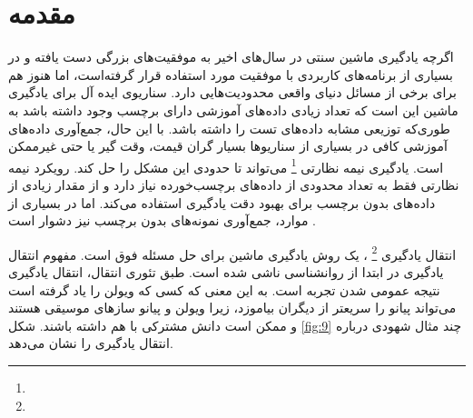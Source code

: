 \section{مقدمه}
{
	اگرچه یادگیری ماشین سنتی در سال‌های اخیر به موفقیت‌های بزرگی دست یافته و در بسیاری از برنامه‌های کاربردی با موفقیت مورد استفاده قرار گرفته‌است، اما هنوز هم برای برخی از مسائل دنیای واقعی محدودیت‌هایی دارد. سناریوی ایده آل برای یادگیری ماشین این است که تعداد زیادی داده‌های آموزشی دارای برچسب وجود داشته باشد به طوری‌که توزیعی مشابه داده‌های تست  را داشته باشد. با این حال، جمع‌آوری داده‌های آموزشی کافی در بسیاری از سناریوها بسیار گران قیمت، وقت گیر یا حتی غیرممکن است. یادگیری نیمه نظارتی
	\footnote{}
	 می‌تواند تا حدودی این مشکل را حل کند. رویکرد نیمه نظارتی فقط به تعداد محدودی از داده‌های برچسب‌‌‌خورده نیاز دارد و از مقدار زیادی از داده‌های بدون برچسب برای بهبود دقت یادگیری استفاده می‌کند. اما در بسیاری از موارد، جمع‌آوری نمونه‌های بدون برچسب نیز دشوار است
	\cite{zhuang2020comprehensive}.
	
	
	انتقال یادگیری
	\footnote{}
	، یک روش یادگیری ماشین برای حل مسئله فوق است. مفهوم انتقال یادگیری در ابتدا از روانشناسی ناشی شده است. طبق تئوری انتقال، انتقال یادگیری نتیجه عمومی شدن تجربه است. به  این معنی که کسی که ویولن را یاد گرفته است می‌تواند پیانو را سریعتر از دیگران بیاموزد، زیرا ویولن و پیانو سازهای موسیقی هستند و ممکن است دانش مشترکی با هم داشته باشند. شکل
	\ref{fig:9}
	چند مثال شهودی درباره انتقال یادگیری را نشان می‌دهد.
	
}
